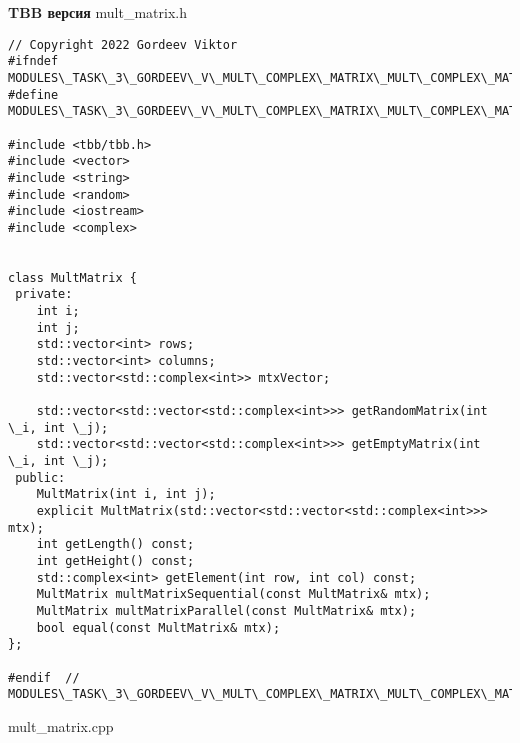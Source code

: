 \documentclass{report}
\begin{document}
\textbf{TBB версия}
\newline
\newline mult\_matrix.h
\begin{lstlisting}
// Copyright 2022 Gordeev Viktor
#ifndef MODULES\_TASK\_3\_GORDEEV\_V\_MULT\_COMPLEX\_MATRIX\_MULT\_COMPLEX\_MATRIX\_H\_
#define MODULES\_TASK\_3\_GORDEEV\_V\_MULT\_COMPLEX\_MATRIX\_MULT\_COMPLEX\_MATRIX\_H\_

#include <tbb/tbb.h>
#include <vector>
#include <string>
#include <random>
#include <iostream>
#include <complex>


class MultMatrix {
 private:
    int i;
    int j;
    std::vector<int> rows;
    std::vector<int> columns;
    std::vector<std::complex<int>> mtxVector;

    std::vector<std::vector<std::complex<int>>> getRandomMatrix(int \_i, int \_j);
    std::vector<std::vector<std::complex<int>>> getEmptyMatrix(int \_i, int \_j);
 public:
    MultMatrix(int i, int j);
    explicit MultMatrix(std::vector<std::vector<std::complex<int>>> mtx);
    int getLength() const;
    int getHeight() const;
    std::complex<int> getElement(int row, int col) const;
    MultMatrix multMatrixSequential(const MultMatrix& mtx);
    MultMatrix multMatrixParallel(const MultMatrix& mtx);
    bool equal(const MultMatrix& mtx);
};

#endif  // MODULES\_TASK\_3\_GORDEEV\_V\_MULT\_COMPLEX\_MATRIX\_MULT\_COMPLEX\_MATRIX\_H\_

\end{lstlisting}
mult\_matrix.cpp
\end{document}
